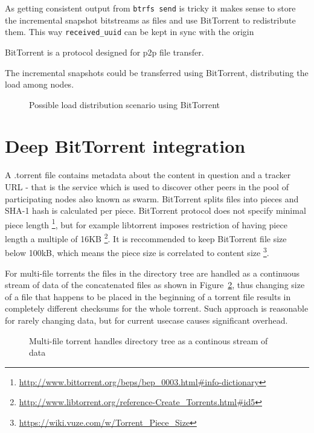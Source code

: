 \documentclass[a4paper,11pt]{kth-mag}
\begin{document}
As getting consistent output from \texttt{btrfs send}
is tricky it makes sense to store the incremental snapshot
bitstreams as files and use BitTorrent to redistribute them.
This way \texttt{received\_uuid} can be kept in sync with the origin


BitTorrent is a protocol designed for \gls{p2p} file transfer.

The incremental snapshots could be transferred
using BitTorrent, distributing the load among
nodes.

\begin{figure}[!htb]
\centering
\scalebox{0.5}{}
\caption{Possible load distribution scenario using BitTorrent}
\label{fig:butterknife-usecase-bittorrent}
\end{figure}




\section{Deep BitTorrent integration}

A .torrent file contains metadata about the content in question and a
tracker URL - that is the service which is used to discover other peers in the
pool of participating nodes also known as swarm.
BitTorrent splits files into pieces and SHA-1 hash is calculated per piece.
BitTorrent protocol does not specify minimal piece length
\footnote{\url{http://www.bittorrent.org/beps/bep_0003.html\#info-dictionary}},
but for example libtorrent imposes restriction of having piece length
a multiple of 16KB
\footnote{\url{http://www.libtorrent.org/reference-Create_Torrents.html\#id5}}.
It is reccommended to keep BitTorrent file size below 100kB,
which means the piece size is correlated to content size
\footnote{\url{https://wiki.vuze.com/w/Torrent_Piece_Size}}.

For multi-file torrents the files in the directory tree are handled
as a continuous stream of data of the concatenated files
as shown in Figure~\ref{fig:torrent-multifile},
thus changing size of a file that happens to be placed in the beginning of a torrent
file results in completely different checksums for the whole torrent.
Such approach is reasonable for rarely changing data, but for current usecase
causes significant overhead.


\begin{figure}[!htb]
\centering
\scalebox{0.35}{}
\caption{Multi-file torrent handles directory tree as a continous stream of data}
\label{fig:torrent-multifile}
\end{figure}
\end{document}
